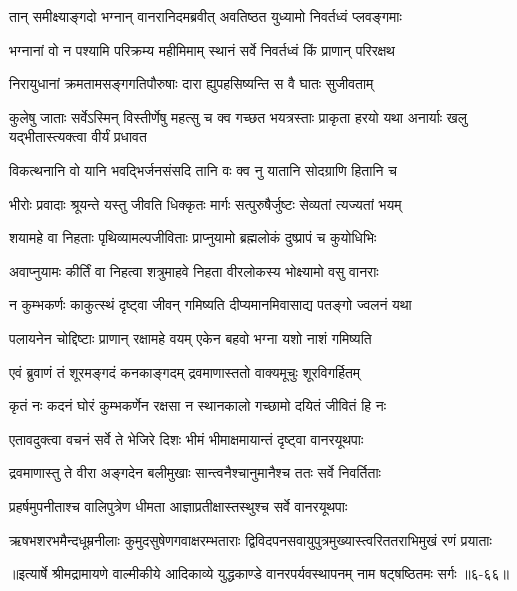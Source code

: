 \twolineshloka
{तान् समीक्ष्याङ्गदो भग्नान् वानरानिदमब्रवीत्}
{अवतिष्ठत युध्यामो निवर्तध्वं प्लवङ्गमाः} %

\twolineshloka
{भग्नानां वो न पश्यामि परिक्रम्य महीमिमाम्}
{स्थानं सर्वे निवर्तध्वं किं प्राणान् परिरक्षथ} %

\twolineshloka
{निरायुधानां क्रमतामसङ्गगतिपौरुषाः}
{दारा ह्युपहसिष्यन्ति स वै घातः सुजीवताम्} %

\threelineshloka
{कुलेषु जाताः सर्वेऽस्मिन् विस्तीर्णेषु महत्सु च}
{क्व गच्छत भयत्रस्ताः प्राकृता हरयो यथा}
{अनार्याः खलु यद्भीतास्त्यक्त्वा वीर्यं प्रधावत} %

\twolineshloka
{विकत्थनानि वो यानि भवद्भिर्जनसंसदि}
{तानि वः क्व नु यातानि सोदग्राणि हितानि च} %

\twolineshloka
{भीरोः प्रवादाः श्रूयन्ते यस्तु जीवति धिक्कृतः}
{मार्गः सत्पुरुषैर्जुष्टः सेव्यतां त्यज्यतां भयम्} %

\twolineshloka
{शयामहे वा निहताः पृथिव्यामल्पजीविताः}
{प्राप्नुयामो ब्रह्मलोकं दुष्प्रापं च कुयोधिभिः} %

\twolineshloka
{अवाप्नुयामः कीर्तिं वा निहत्वा शत्रुमाहवे}
{निहता वीरलोकस्य भोक्ष्यामो वसु वानराः} %

\twolineshloka
{न कुम्भकर्णः काकुत्स्थं दृष्ट्वा जीवन् गमिष्यति}
{दीप्यमानमिवासाद्य पतङ्गो ज्वलनं यथा} %

\twolineshloka
{पलायनेन चोद्दिष्टाः प्राणान् रक्षामहे वयम्}
{एकेन बहवो भग्ना यशो नाशं गमिष्यति} %

\twolineshloka
{एवं ब्रुवाणं तं शूरमङ्गदं कनकाङ्गदम्}
{द्रवमाणास्ततो वाक्यमूचुः शूरविगर्हितम्} %

\twolineshloka
{कृतं नः कदनं घोरं कुम्भकर्णेन रक्षसा}
{न स्थानकालो गच्छामो दयितं जीवितं हि नः} %

\twolineshloka
{एतावदुक्त्वा वचनं सर्वे ते भेजिरे दिशः}
{भीमं भीमाक्षमायान्तं दृष्ट्वा वानरयूथपाः} %

\twolineshloka
{द्रवमाणास्तु ते वीरा अङ्गदेन बलीमुखाः}
{सान्त्वनैश्चानुमानैश्च ततः सर्वे निवर्तिताः} %

\twolineshloka
{प्रहर्षमुपनीताश्च वालिपुत्रेण धीमता}
{आज्ञाप्रतीक्षास्तस्थुश्च सर्वे वानरयूथपाः} %

\twolineshloka
{ऋषभशरभमैन्दधूम्रनीलाः कुमुदसुषेणगवाक्षरम्भताराः}
{द्विविदपनसवायुपुत्रमुख्यास्त्वरिततराभिमुखं रणं प्रयाताः} %


॥इत्यार्षे श्रीमद्रामायणे वाल्मीकीये आदिकाव्ये युद्धकाण्डे वानरपर्यवस्थापनम् नाम षट्षष्ठितमः सर्गः ॥६-६६॥
